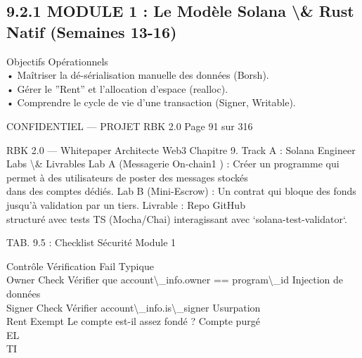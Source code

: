 \documentclass[12pt,landscape,a4paper]{article}
\newenvironment{confidential}
{\begin{tcolorbox}[
    colback=rbkred!5!white,
    colframe=rbkred!75!black,
    title=CONFIDENTIEL,
    fonttitle=\bfseries\color{white},
    coltitle=rbkred!75!black,
    breakable,
    enhanced,
    frame hidden,
    borderline west={2pt}{0pt}{rbkred!75!black}
]}
{\end{tcolorbox}}
\begin{document}
\subsection{9.2.1 MODULE 1 : Le Modèle Solana \textbackslash{}& Rust Natif (Semaines 13-16)}
Objectifs Opérationnels\\
\vspace{0.5em}
• Maîtriser la dé-sérialisation manuelle des données (Borsh).\\
\vspace{0.5em}
• Gérer le ”Rent” et l’allocation d’espace (realloc).\\
\vspace{0.5em}
• Comprendre le cycle de vie d’une transaction (Signer, Writable).\\
\vspace{0.5em}
\vspace{0.5em}
\vspace{0.5em}
\begin{confidential}CONFIDENTIEL — PROJET RBK 2.0                                Page 91 sur 316\end{confidential}
RBK 2.0 — Whitepaper Architecte Web3                                                                                   Chapitre 9. Track A : Solana Engineer\\
\vspace{0.5em}
\vspace{0.5em}
Labs \textbackslash{}& Livrables Lab A (Messagerie On-chain1 ) : Créer un programme qui permet à des utilisateurs de poster des messages stockés\\
dans des comptes dédiés. Lab B (Mini-Escrow) : Un contrat qui bloque des fonds jusqu’à validation par un tiers. Livrable : Repo GitHub\\
structuré avec tests TS (Mocha/Chai) interagissant avec ‘solana-test-validator‘.\\
\vspace{0.5em}
\begin{center}\begin{tabular}TAB. 9.5 : Checklist Sécurité Module 1\end{tabular}\end{center}
\vspace{0.5em}
\vspace{0.5em}
Contrôle     Vérification                                 Fail Typique\\
Owner Check Vérifier que account\textbackslash{}_info.owner == program\textbackslash{}_id Injection de données\\
Signer Check Vérifier account\textbackslash{}_info.is\textbackslash{}_signer              Usurpation\\
Rent Exempt Le compte est-il assez fondé ?                Compte purgé\\
\vspace{0.5em}
\vspace{0.5em}
\vspace{0.5em}
\vspace{0.5em}
EL\\
TI\\
\end{document}
